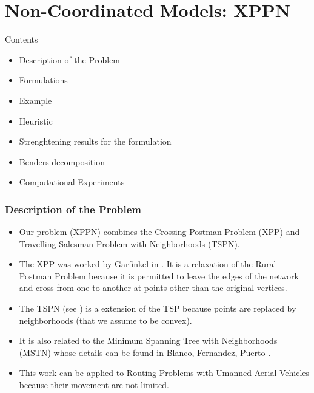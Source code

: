 \documentclass[slidestop,usepdftitle=false,10pt]{beamer}
\begin{document}
	\section{Non-Coordinated Models: XPPN}
	\begin{frame}{Contents}
	    \begin{itemize}
		    \item Description of the Problem
		    \item Formulations
		    \item Example
		    \item Heuristic
		    \item Strenghtening results for the formulation
		    \item Benders decomposition
		    \item Computational Experiments
		\end{itemize}
	\end{frame}
	\begin{frame}
		\frametitle{Description of the Problem}
		\begin{itemize}
			\item Our problem (XPPN) combines the Crossing Postman Problem (XPP) and Travelling Salesman Problem with Neighborhoods (TSPN). 
			\item The XPP was worked by Garfinkel in \cite{garfinkel1999crossings}. It is a relaxation of the Rural Postman Problem because it is permitted to leave the edges of the network and cross from one to another at points other than the original vertices.
			\item The TSPN (see \cite{TSPN}) is a extension of the TSP because points are replaced by neighborhoods (that we assume to be convex).
			\item It is also related to the Minimum Spanning Tree with Neighborhoods (MSTN) whose details can be found in Blanco, Fernandez, Puerto \cite{MSTN}.
			\item This work can be applied to Routing Problems with Umanned Aerial Vehicles because their movement are not limited.
		\end{itemize}
	\end{frame}
	
\end{document}
